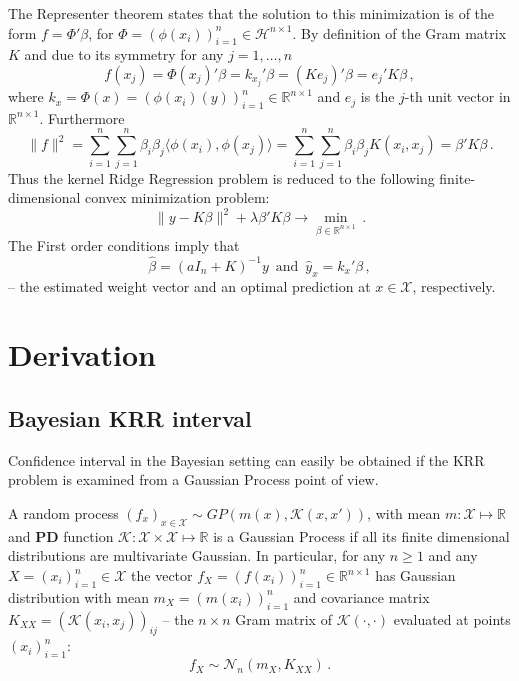 \documentclass[a4paper,14pt]{extarticle}
\newcommand{\Hcal}{\mathcal{H}}
\newcommand{\Ncal}{\mathcal{N}}
\newcommand{\Kcal}{\mathcal{K}}
\newcommand{\Xcal}{\mathcal{X}}
\newcommand{\Real}{\mathbb{R}}
\begin{document}
The Representer theorem states that the solution to this minimization is of the form
$f = \Phi'\beta$, for $\Phi = (\phi(x_i))_{i=1}^n \in \Hcal^{n\times 1}$. By definition
of the Gram matrix $K$ and due to its symmetry for any $j=1,\ldots,n$
$$ f(x_j)
  = \Phi(x_j)' \beta
  = k_{x_j}' \beta
  = (K e_j)' \beta
  = e_j' K \beta
  \,, $$
where $k_x = \Phi(x) = (\phi(x_i)(y))_{i=1}^n \in \Real^{n\times 1}$ and $e_j$ is
the $j$-th unit vector in $\Real^{n\times 1}$. Furthermore
$$ \| f \|^2
  = \sum_{i=1}^n\sum_{j=1}^n\beta_i\beta_j \langle\phi(x_i), \phi(x_j)\rangle
  = \sum_{i=1}^n\sum_{j=1}^n\beta_i\beta_j K(x_i, x_j)
  = \beta' K \beta \,. $$
Thus the kernel Ridge Regression problem is reduced to the following finite-dimensional
convex minimization problem:
$$ \|y - K \beta \|^2 + \lambda \beta' K \beta \to \min_{\beta\in \Real^{n\times 1}} \,. $$
The First order conditions imply that
$$ \hat{\beta} = (aI_n + K)^{-1} y \,\text{ and }\, \hat{y}_x = k_x' \beta \,, $$
-- the estimated weight vector and an optimal prediction at $x\in \Xcal$, respectively.



\section{Derivation} %
\label{sec:derivation}

\subsection{Bayesian KRR interval} %
\label{sub:bayesian_krr_interval}

Confidence interval in the Bayesian setting can easily be obtained if the KRR
problem is examined from a Gaussian Process point of view.

A random process $(f_x)_{x\in \Xcal} \sim GP(m(x), \Kcal(x,x'))$, with mean $m : \Xcal
\mapsto \Real$ and \textbf{PD} function $\Kcal : \Xcal \times \Xcal \mapsto \Real$
is a Gaussian Process if all its finite dimensional distributions are multivariate
Gaussian. In particular, for any $n\geq1$ and any $X = (x_i)_{i=1}^n \in \Xcal$ the
vector $f_X = (f(x_i))_{i=1}^n \in \Real^{n\times 1}$ has Gaussian distribution with
mean $m_X = (m(x_i))_{i=1}^n$ and covariance matrix $K_{XX} = (\Kcal(x_i,x_j))_{ij}$ --
the $n\times n$ Gram matrix of $\Kcal(\cdot,\cdot)$ evaluated at points $(x_i)_{i=1}^n$:
\begin{equation*}
  f_X \sim \Ncal_n(m_X, K_{XX}) \,.
\end{equation*}
\end{document}
